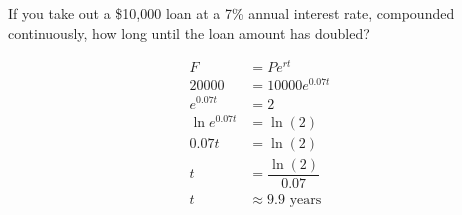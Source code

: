 \documentclass[11pt,letterpaper]{article}
\begin{document}
 If you take out a \$10,000 loan at a 7\% annual interest rate, compounded continuously, how long until the loan amount has doubled? \pspace

\sol 
	\[
	\begin{aligned}
	F&= P e^{rt} \\[0.3cm]
	20000&= 10000 e^{0.07 t} \\[0.3cm]
	e^{0.07t}&= 2 \\[0.3cm]
	\ln e^{0.07t}&= \ln(2) \\[0.3cm]
	0.07t&= \ln(2) \\[0.3cm]
	t&= \dfrac{\ln(2)}{0.07} \\[0.3cm]
	t&\approx 9.9 \text{ years}
	\end{aligned}
	\]
\end{document}

